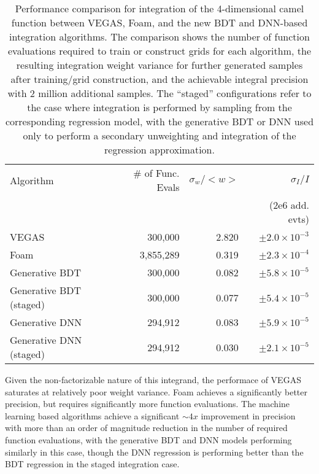\documentclass[a4paper,11pt]{article}
\begin{document}
\begin{table}[htb!]
\begin{center}
 \begin{tabular}{l|r|r|r}
 Algorithm & \# of Func. Evals & $\sigma_w/<w>$ & $\sigma_{I}/I$ \\
           &                   &                & (2e6 add. evts) \\\hline
 VEGAS & 300,000 & 2.820 & $\pm 2.0\times 10^{-3}$ \\
 Foam  & 3,855,289 & 0.319 & $\pm 2.3\times 10^{-4}$\\
 Generative BDT  & 300,000 & 0.082 & $\pm 5.8\times 10^{-5}$\\
 Generative BDT (staged) & 300,000 & 0.077 & $\pm 5.4\times 10^{-5}$\\
 Generative DNN & 294,912 & 0.083 & $\pm 5.9\times 10^{-5}$\\
 Generative DNN (staged) & 294,912 & 0.030 & $\pm 2.1\times 10^{-5}$\\
 \end{tabular}
 \caption{Performance comparison for integration of the 4-dimensional camel function between VEGAS, Foam, and the new BDT and DNN-based integration algorithms.  The comparison shows the number of function evaluations required to train or construct grids for each algorithm, the resulting integration weight variance for further generated samples after training/grid construction, and the achievable integral precision with 2 million additional samples.  The ``staged'' configurations refer to the case where integration is performed by sampling from the corresponding regression model, with the generative BDT or DNN used only to perform a secondary unweighting and integration of the regression approximation.}
 \label{tab:camel4d}
 \end{center}
\end{table}

Given the non-factorizable nature of this integrand, the performace of VEGAS saturates at relatively poor weight variance.  Foam achieves a significantly better precision, but requires significantly more function evaluations.  The machine learning based algorithms achieve a significant $\sim 4x$ improvement in precision with more than an order of magnitude reduction in the number of required function evaluations, with the generative BDT and DNN models performing similarly in this case, though the DNN regression is performing better than the BDT regression in the staged integration case.
\end{document}
